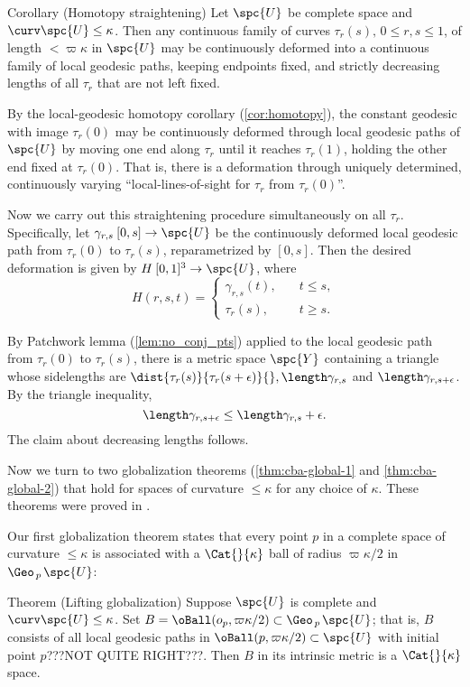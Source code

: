 \begin{thm}{Corollary (Homotopy straightening)}
\label{cor:straight}
Let $\spc{U}$ be complete space and $\curv\spc{U}\le\kappa$. 
Then any continuous family of curves $\tau_r(s), \,0\le r,s\le 1$, of length $< \varpi\kappa$ in $\spc{U}$ may be continuously deformed into a continuous family of local geodesic paths, keeping endpoints fixed, and strictly decreasing lengths of all $\tau_r$ that are not left fixed. 
\end{thm}

  By the local-geodesic homotopy corollary (\ref{cor:homotopy}), the constant geodesic with image $\tau_r(0)$ may be continuously deformed through local geodesic paths of $\spc{U}$ by moving one end along $\tau_r$ until it reaches $\tau_r(1)$,  holding the other end fixed at $\tau_r(0)$. That is, there is a deformation through uniquely determined, continuously varying ``local-lines-of-sight for $\tau_r$ from $\tau_r(0)$''. 

Now we carry out this straightening procedure simultaneously on all $\tau_r$.  Specifically, let $\gamma_{r,s}\:[0,s]\to \spc{U} $ be the continuously deformed local geodesic path from $\tau_r(0)$ to $\tau_r(s)$, reparametrized by $[0,s]$. Then the desired deformation is given by $H\:[0,1]^3\to \spc{U}$, where
$$
H(r,s,t)=
\begin{cases}
\gamma_{r,s}(t),\quad & t\le s,\\
\tau_r(s),\quad & t\ge s.
\end{cases}
$$

By Patchwork lemma (\ref{lem:no_conj_pts}) applied to the local geodesic path from $\tau_r(0)$ to $\tau_r(s)$, there is a metric space $\spc{Y}$ containing a triangle whose  sidelengths  are $\dist {\tau_r(s)}{\tau_r(s+\epsilon)}{}, \length \gamma_{r,s}$ and $\length \gamma_{r,s+\epsilon}$.  By the triangle inequality,
$$ \length \gamma_{r,s+\epsilon} \le \length \gamma_{r,s} + \epsilon.$$
The claim about decreasing lengths follows.
\qeds

Now we turn to two globalization theorems (\ref{thm:cba-global-1} and \ref{thm:cba-global-2}) that hold for spaces of curvature $\le\kappa$ for any choice of $\kappa$.  These theorems were proved in  \cite{a-b:cbc}.


Our first globalization theorem states that every point $p$ in a complete space of curvature $\le\kappa$ is associated with a $\Cat{}{\kappa}$ ball of radius $\varpi\kappa/2$ in $\Geo_{\,p\,}\spc{U}$:

 \begin{thm}{Theorem (Lifting globalization)}
\label{thm:cba-global-1}
Suppose $\spc{U}$ is complete and $\curv\spc{U}\le\kappa$. 
Set $B=\oBall(o_p,\varpi\kappa/2)\subset \Geo_{\,p\,}\spc{U}$;  that is, $B$ consists of all local geodesic paths in $\oBall(p,\varpi\kappa/2)\subset \spc{U}$ with initial point $p$???NOT QUITE RIGHT???.  
Then $B$ in its intrinsic metric  is a $\Cat{}{\kappa}$ space.
\end{thm}









